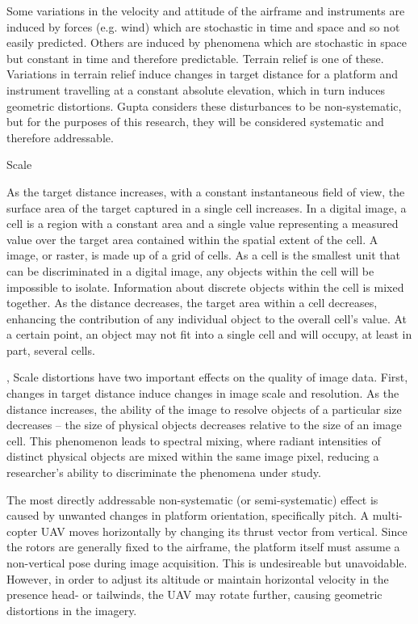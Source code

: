 \documentclass[10pt]{article}
\begin{document}
Some variations in the velocity and attitude of the airframe and instruments are induced by forces (e.g. wind) which are stochastic in time and space and so not easily predicted. Others are induced by phenomena which are stochastic in space but constant in time and therefore predictable. Terrain relief is one of these. Variations in terrain relief induce changes in target distance for a platform and instrument travelling at a constant absolute elevation, which in turn induces geometric distortions. Gupta \cite{Gupta2018} considers these disturbances to be non-systematic, but for the purposes of this research, they will be considered systematic and therefore addressable.

Scale

As the target distance increases, with a constant instantaneous field of view, the surface area of the target captured in a single cell increases. In a digital image, a cell is a region with a constant area and a single value representing a measured value over the target area contained within the spatial extent of the cell. A image, or raster, is made up of a grid of cells. As a cell is the smallest unit that can be discriminated in a digital image, any objects within the cell will be impossible to isolate. Information about discrete objects within the cell is mixed together. As the distance decreases, the target area within a cell decreases, enhancing the contribution of any individual object to the overall cell's value. At a certain point, an object may not fit into a single cell and will occupy, at least in part, several cells. 


, Scale distortions have two important effects on the quality of image data. First, changes in target distance induce changes in image scale and resolution. As the distance increases, the ability of the image to resolve objects of a particular size decreases -- the size of physical objects decreases relative to the size of an image cell. This phenomenon leads to spectral mixing, where radiant intensities of distinct physical objects are mixed within the same image pixel, reducing a researcher's ability to discriminate the phenomena under study.

The most directly addressable non-systematic (or semi-systematic) effect is caused by unwanted changes in platform orientation, specifically pitch. A multi-copter UAV moves horizontally by changing its thrust vector from vertical. Since the rotors are generally fixed to the airframe, the platform itself must assume a non-vertical pose during image acquisition. This is undesireable but unavoidable. However, in order to adjust its altitude or maintain horizontal velocity in the presence head- or tailwinds, the UAV may rotate further, causing geometric distortions in the imagery. 
\end{document}
